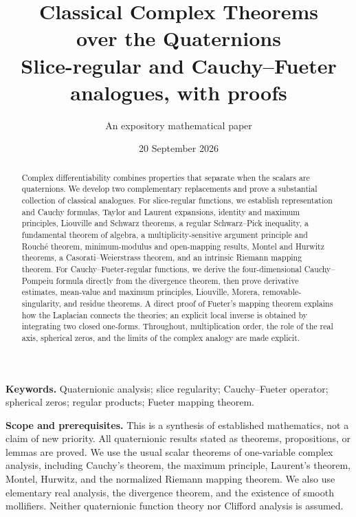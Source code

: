 \documentclass[11pt,a4paper]{article}
\title{\vspace{-12mm}\textbf{Classical Complex Theorems\\over the Quaternions}\\[5pt]
\large Slice-regular and Cauchy--Fueter analogues, with proofs}
\author{An expository mathematical paper}
\date{20 September 2026}
\numberwithin{equation}{section}
\theoremstyle{definition}
\theoremstyle{remark}
\begin{document}
\maketitle
\thispagestyle{empty}
\begin{abstract}
Complex differentiability combines properties that separate when the scalars are
quaternions. We develop two complementary replacements and prove a substantial
collection of classical analogues. For slice-regular functions, we establish
representation and Cauchy formulas, Taylor and Laurent expansions, identity and
maximum principles, Liouville and Schwarz theorems, a regular Schwarz--Pick
inequality, a fundamental theorem of algebra, a multiplicity-sensitive argument
principle and Rouch\'e theorem, minimum-modulus and open-mapping results, Montel
and Hurwitz theorems, a Casorati--Weierstrass theorem, and an intrinsic Riemann
mapping theorem. For Cauchy--Fueter-regular functions, we derive the
four-dimensional Cauchy--Pompeiu formula directly from the divergence theorem,
then prove derivative estimates, mean-value and maximum principles, Liouville,
Morera, removable-singularity, and residue theorems. A direct proof of Fueter's
mapping theorem explains how the Laplacian connects the theories; an explicit
local inverse is obtained by integrating two closed one-forms. Throughout,
multiplication order, the role of the real axis, spherical zeros, and the limits
of the complex analogy are made explicit.
\end{abstract}
\vspace{3pt}
\noindent\textbf{Keywords.} Quaternionic analysis; slice regularity; Cauchy--Fueter
operator; spherical zeros; regular products; Fueter mapping theorem.

\medskip
\noindent\textbf{Scope and prerequisites.} This is a synthesis of established
mathematics, not a claim of new priority. All quaternionic results stated as
theorems, propositions, or lemmas are proved. We use the usual scalar theorems of
one-variable complex analysis, including Cauchy's theorem, the maximum principle,
Laurent's theorem, Montel, Hurwitz, and the normalized Riemann mapping theorem.
We also use elementary real analysis, the divergence theorem, and the existence
of smooth mollifiers. Neither quaternionic function theory nor Clifford
analysis is assumed.
\newpage
\begingroup
\small
\setlength{\parskip}{0pt}
\makeatletter
\patchcmd{\l@section}{1.0em}{0.45em}{}{}
\makeatother
\tableofcontents
\endgroup
\newpage
\end{document}
